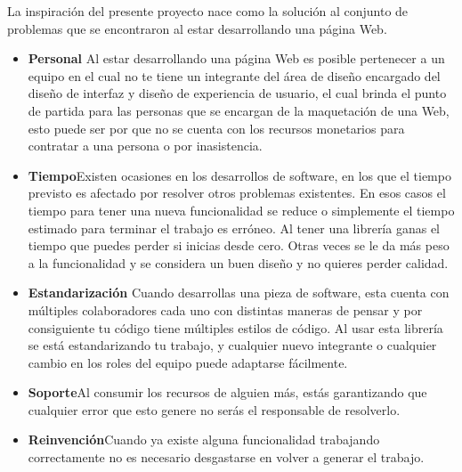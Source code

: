 La inspiración del presente proyecto nace como la solución al conjunto de problemas que se encontraron al estar desarrollando una página Web.

\begin{itemize}

   \item \textbf{Personal} \newline Al estar desarrollando una página Web es posible pertenecer a un equipo en el cual no te tiene un integrante del área de diseño encargado del diseño de interfaz y diseño de experiencia de usuario, el cual brinda el punto de partida para las personas que se encargan de la maquetación de una Web, esto puede ser por que no se cuenta con los recursos monetarios para contratar a una persona o por inasistencia.  
   \item \textbf{Tiempo}\newline  Existen ocasiones en los desarrollos de software, en los que el tiempo previsto es afectado por resolver otros problemas existentes. En esos casos el tiempo para tener una nueva funcionalidad se reduce o simplemente el tiempo estimado para terminar el trabajo es erróneo. Al tener una librería ganas el tiempo que puedes perder si inicias desde cero. Otras veces se le da más peso a la funcionalidad y se considera un buen diseño y no quieres perder calidad.
   \item \textbf{Estandarización} \newline Cuando desarrollas una pieza de software, esta cuenta con múltiples colaboradores cada uno con distintas maneras de pensar y por consiguiente tu código tiene múltiples estilos de código.   Al usar esta librería se está estandarizando tu trabajo, y cualquier nuevo integrante o cualquier cambio en los roles del equipo puede adaptarse fácilmente.
   \item \textbf{Soporte}\newline  Al consumir los recursos de alguien más, estás garantizando que cualquier error que esto genere no serás el responsable de resolverlo.
   \item \textbf{Reinvención}\newline  Cuando ya existe alguna funcionalidad trabajando correctamente no es necesario desgastarse en volver a generar el trabajo.
\end{itemize}